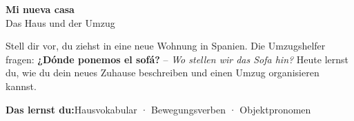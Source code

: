\documentclass[11pt, a4paper]{article}
\newcommand{\seriftext}[1]{{\fontfamily{ppl}\selectfont #1}}
\newcommand{\thema}{Mi nueva casa}
\newcommand{\untertitel}{Das Haus und der Umzug}
\newcommand{\lernziele}{Hausvokabular · Bewegungsverben · Objektpronomen}
\newcommand{\es}[1]{\seriftext{\textbf{#1}}}
\newcommand{\de}[1]{\textit{\textcolor{akzent}{#1}}}
\begin{document}
\begin{center}
    {\LARGE\bfseries \thema}\\[3pt]
    {\small \untertitel}
\end{center}

\vspace{4pt}

Stell dir vor, du ziehst in eine neue Wohnung in Spanien. Die Umzugshelfer fragen: \es{¿Dónde ponemos el sofá?} -- \de{Wo stellen wir das Sofa hin?} Heute lernst du, wie du dein neues Zuhause beschreiben und einen Umzug organisieren kannst.

\vspace{2pt}

\begin{lernzielbox}
\textbf{Das lernst du:}\quad \lernziele
\end{lernzielbox}

\end{document}
